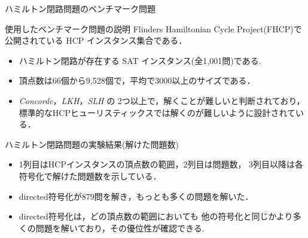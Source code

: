 \documentclass[dvipdfmx,10pt]{beamer}
\begin{document}
\begin{frame}{ハミルトン閉路問題のベンチマーク問題}
\begin{block}{使用したベンチマーク問題の説明}
Flinders Hamiltonian Cycle Project(FHCP)\footnotemark で
公開されている HCP インスタンス集合である．
\begin{itemize}
 \item ハミルトン閉路が存在する\alert{ SAT インスタンス(全1,001問)}である.
 \item 頂点数は66個から9,528個で，平均で3000以上のサイズである．
 \item \textit{Concorde}，\textit{LKH}，\textit{SLH} の
       2つ以上で，解くことが難しいと判断されており，
       標準的なHCPヒューリスティックスでは解くのが難しいように設計されている．
\end{itemize}
\end{block}
\end{frame}
\begin{frame}{ハミルトン閉路問題の実験結果(解けた問題数)}
\begin{itemize}
\item 1列目はHCPインスタンスの頂点数の範囲，2列目は問題数，
      3列目以降は各符号化で解けた問題数を示している．
\item \textsf{directed}符号化が879問を解き，もっとも多くの問題を解いた．
\item \textsf{directed}符号化は，どの頂点数の範囲においても
      他の符号化と同じかより多くの問題を解いており，その優位性が確認できる.
\end{itemize}
\end{frame}
\end{document}
